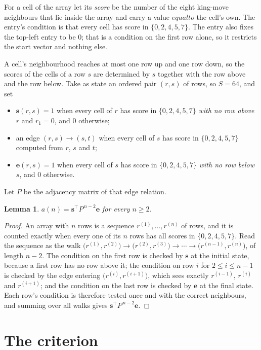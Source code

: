 \documentclass[11pt,a4paper]{article}
\theoremstyle{plain}
\newtheorem{lemma}[theorem]{Lemma}
\theoremstyle{definition}
\begin{document}
For a cell of the array let its \emph{score} be the number of the eight king-move neighbours that lie inside
the array and carry a value $equal to$ the cell's own. The entry's condition is that every cell
has score in $\{0,2,4,5,7\}$. The entry also fixes the top-left entry to be $0$; that is a condition on the first row alone, so it restricts the start vector and nothing else.

A cell's neighbourhood reaches at most one row up and one row down, so the scores of the
cells of a row $s$ are determined by $s$ together with the row above and the row below.
Take as state an ordered pair $(r,s)$ of rows, so $S=64$, and set
\begin{itemize}
\item $\mathbf{s}(r,s)=1$ when every cell of $r$ has score in $\{0,2,4,5,7\}$ \emph{with no row
above $r$} and $r_1=0$, and $0$ otherwise;
\item an edge $(r,s)\to(s,t)$ when every cell of $s$ has score in $\{0,2,4,5,7\}$ computed from
$r$, $s$ and $t$;
\item $\mathbf{e}(r,s)=1$ when every cell of $s$ has score in $\{0,2,4,5,7\}$ \emph{with no row
below $s$}, and $0$ otherwise.
\end{itemize}
Let $P$ be the adjacency matrix of that edge relation.

\begin{lemma}\label{lem:walk}
$a(n)=\mathbf{s}^{\!\top}P^{\,n-2}\mathbf{e}$ for every $n\ge2$.
\end{lemma}

\begin{proof}
An array with $n$ rows is a sequence $r^{(1)},\dots,r^{(n)}$ of rows, and it is counted
exactly when every one of its $n$ rows has all scores in $\{0,2,4,5,7\}$. Read the sequence as the
walk $\bigl(r^{(1)},r^{(2)}\bigr)\to\bigl(r^{(2)},r^{(3)}\bigr)\to\cdots\to
\bigl(r^{(n-1)},r^{(n)}\bigr)$, of length $n-2$. The condition on the first row is
checked by $\mathbf{s}$ at the initial state, because a first row has no row above it; the
condition on row $i$ for $2\le i\le n-1$ is checked by the edge entering
$\bigl(r^{(i)},r^{(i+1)}\bigr)$, which sees exactly $r^{(i-1)}$, $r^{(i)}$ and
$r^{(i+1)}$; and the condition on the last row is checked by $\mathbf{e}$ at the final
state. Each row's condition is therefore tested once and with the correct neighbours, and
summing over all walks gives $\mathbf{s}^{\!\top}P^{\,n-2}\mathbf{e}$.
\end{proof}

\section{The criterion}
\end{document}
